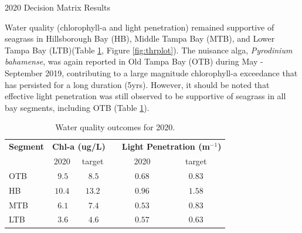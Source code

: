 \documentclass[final,t]{beamer}\usepackage[]{graphicx}\usepackage[]{color}
\begin{document}
\begin{frame}
\begin{columns}[t]
\begin{column}{.79\linewidth}
\begin{block}{2020 Decision Matrix Results}
\vspace{-0.1in}
\begin{minipage}{0.45\textwidth}
\footnotesize
Water quality (chlorophyll-a and light penetration) remained supportive of seagrass in Hillsborough Bay (HB), Middle Tampa Bay (MTB), and Lower Tampa Bay (LTB)(Table \ref{tab:segtab}, Figure \ref{fig:thrplot}). The nuisance alga, \textit{Pyrodinium bahamense}, was again reported in Old Tampa Bay (OTB) during May - September 2019, contributing to a large magnitude chlorophyll-a exceedance that has persisted for a long duration (5yrs). However, it should be noted that effective light penetration was still observed to be supportive of seagrass in all bay segments, including OTB (Table \ref{tab:segtab}).
\end{minipage}
\hspace{0.1in}
\begin{minipage}{0.5\textwidth}
\footnotesize
\begin{table}[!tbp]
\caption{{\footnotesize Water quality outcomes for 2020.}\label{tab:segtab}} 
\begin{center}
\begin{tabular}{lccccc}
\hline\hline
\multicolumn{1}{l}{\bfseries Segment}&\multicolumn{2}{c}{\bfseries Chl-a (ug/L)}&\multicolumn{1}{c}{\bfseries }&\multicolumn{2}{c}{\bfseries Light Penetration (m$^{-1}$)}\tabularnewline
\cline{2-3} \cline{5-6}
\multicolumn{1}{l}{}&\multicolumn{1}{c}{2020}&\multicolumn{1}{c}{target}&\multicolumn{1}{c}{}&\multicolumn{1}{c}{2020}&\multicolumn{1}{c}{target}\tabularnewline
\hline
\cellcolor{yellow}OTB&$~9.5$&$~8.5$&&$0.68$&$0.83$\tabularnewline
\cellcolor{green}HB&$10.4$&$13.2$&&$0.96$&$1.58$\tabularnewline
\cellcolor{green}MTB&$~6.1$&$~7.4$&&$0.53$&$0.83$\tabularnewline
\cellcolor{green}LTB&$~3.6$&$~4.6$&&$0.57$&$0.63$\tabularnewline
\hline
\end{tabular}\end{center}
\end{table}

\end{minipage}

\end{block}

\vspace{-0.55in}


\end{column}
\end{columns}
\end{frame}
\end{document}
